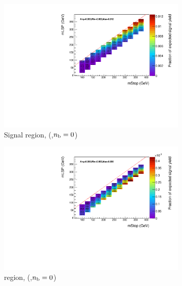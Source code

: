 \begin{figure}[p]
  \centering
  \begin{subfigure}[b]{0.47\textwidth}
    \includegraphics[width=\textwidth]{Figs/sms/t2degen/v23/effs/T2_4body_had_eff_maps_eq0b_le3j_SITV.pdf}
    \caption{Signal region, (\njlow,$n_{\text{b}}=0$)}
    \label{fig:t2_4body_sig_eff_le3j_0b}
  \end{subfigure}
  \begin{subfigure}[b]{0.47\textwidth}
    \includegraphics[width=\textwidth]{Figs/sms/t2degen/v23/effs/T2_4body_muon_eff_maps_eq0b_le3j_SITV.pdf}
    \caption{\mj region, (\njlow,$n_{\text{b}}=0$)}
    \label{fig:t2_4body_mu_eff_le3j_0b}
  \end{subfigure} \\
  \begin{subfigure}[b]{0.47\textwidth}

\end{subfigure}
\end{figure}
